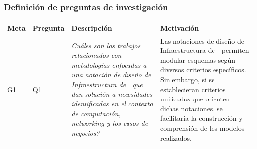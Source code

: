 \subsubsection{Definición de preguntas de investigación}\label{subsubsec:RQ-def}
\begin{table}[H]
	\centering
	\renewcommand{\arraystretch}{1.2} %
	\fontsize{9pt}{10pt}\selectfont %
	\begin{tabular}{|p{0.7cm}|p{1.3cm}|p{5.5cm}|p{6cm}|} %
		\hline
		\textbf{Meta}                                                                                                                                                                                                                                                                                                                                    & \textbf{Pregunta} & \textbf{Descripción} & \textbf{Motivación}        \\ \hline

		G1                                                                                                                                                                                                                                                                                                                                               & Q1                &
		\textit{ \textquestiondown Cuáles son los trabajos relacionados con metodologías enfocadas a una notación de diseño de Infraestructura de~\TI~que dan solución a necesidades identificadas en el contexto de computación, networking y los casos de negocios?} &
		Las notaciones de diseño de Infraestructura de~\TI~permiten modular esquemas según diversos criterios específicos. Sin embargo, si se establecieran criterios unificados que orienten dichas notaciones, se facilitaría la construcción y comprensión de los modelos realizados. \\ \hline


\end{tabular}
\end{table}

